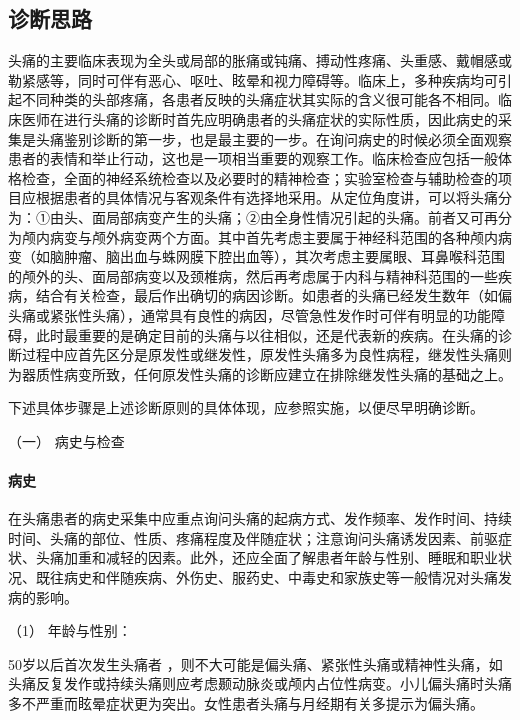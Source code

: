 \subsection{诊断思路}

头痛的主要临床表现为全头或局部的胀痛或钝痛、搏动性疼痛、头重感、戴帽感或勒紧感等，同时可伴有恶心、呕吐、眩晕和视力障碍等。临床上，多种疾病均可引起不同种类的头部疼痛，各患者反映的头痛症状其实际的含义很可能各不相同。临床医师在进行头痛的诊断时首先应明确患者的头痛症状的实际性质，因此病史的采集是头痛鉴别诊断的第一步，也是最主要的一步。在询问病史的时候必须全面观察患者的表情和举止行动，这也是一项相当重要的观察工作。临床检查应包括一般体格检查，全面的神经系统检查以及必要时的精神检查；实验室检查与辅助检查的项目应根据患者的具体情况与客观条件有选择地采用。从定位角度讲，可以将头痛分为：①由头、面局部病变产生的头痛；②由全身性情况引起的头痛。前者又可再分为颅内病变与颅外病变两个方面。其中首先考虑主要属于神经科范围的各种颅内病变（如脑肿瘤、脑出血与蛛网膜下腔出血等），其次考虑主要属眼、耳鼻喉科范围的颅外的头、面局部病变以及颈椎病，然后再考虑属于内科与精神科范围的一些疾病，结合有关检查，最后作出确切的病因诊断。如患者的头痛已经发生数年（如偏头痛或紧张性头痛），通常具有良性的病因，尽管急性发作时可伴有明显的功能障碍，此时最重要的是确定目前的头痛与以往相似，还是代表新的疾病。在头痛的诊断过程中应首先区分是原发性或继发性，原发性头痛多为良性病程，继发性头痛则为器质性病变所致，任何原发性头痛的诊断应建立在排除继发性头痛的基础之上。

下述具体步骤是上述诊断原则的具体体现，应参照实施，以便尽早明确诊断。

\hypertarget{text00020.htmlux5cux23CHP1-7-2-1}{}
（一） 病史与检查

\paragraph{病史}

在头痛患者的病史采集中应重点询问头痛的起病方式、发作频率、发作时间、持续时间、头痛的部位、性质、疼痛程度及伴随症状；注意询问头痛诱发因素、前驱症状、头痛加重和减轻的因素。此外，还应全面了解患者年龄与性别、睡眠和职业状况、既往病史和伴随疾病、外伤史、服药史、中毒史和家族史等一般情况对头痛发病的影响。

\hypertarget{text00020.htmlux5cux23CHP1-7-2-1-1-1}{}
（1） 年龄与性别：

50岁以后首次发生头痛者
，则不大可能是偏头痛、紧张性头痛或精神性头痛，如头痛反复发作或持续头痛则应考虑颞动脉炎或颅内占位性病变。小儿偏头痛时头痛多不严重而眩晕症状更为突出。女性患者头痛与月经期有关多提示为偏头痛。

